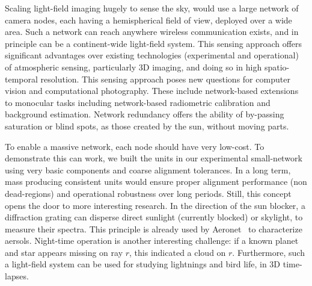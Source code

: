\documentclass[runningheads]{llncs}
\begin{document}
Scaling light-field imaging hugely to sense the sky, would use  a large network of camera nodes, each having a hemispherical field of view, deployed over a wide area. Such a network can reach anywhere wireless communication exists, and in principle can be a continent-wide light-field system. This sensing approach offers significant advantages over existing technologies (experimental and operational) of atmospheric sensing, particularly  3D imaging, and doing so in high spatio-temporal resolution. This sensing approach poses new questions for computer vision and computational photography. These include network-based extensions to monocular tasks including network-based radiometric calibration and background estimation. Network redundancy offers the ability of by-passing saturation or blind spots, as those created by the sun, without moving parts.

To enable a massive network, each node should have very low-cost. To demonstrate this can work, we built the units in our experimental small-network using very basic components and coarse alignment tolerances. In a long term, mass producing consistent units would ensure proper alignment performance (non dead-regions) and operational robustness over long periods. Still, this concept opens the door to more interesting research. In the direction of the sun blocker, a diffraction grating can disperse direct sunlight (currently blocked) or skylight, to measure their spectra. This principle is already used by Aeronet~\cite{Holben1998} to characterize aersols. Night-time operation is another interesting challenge: if a known planet and star appears missing on ray $r$, this indicated a cloud on $r$. Furthermore, such a light-field system can be used for studying lightnings and bird life, in 3D time-lapses.









\end{document}
